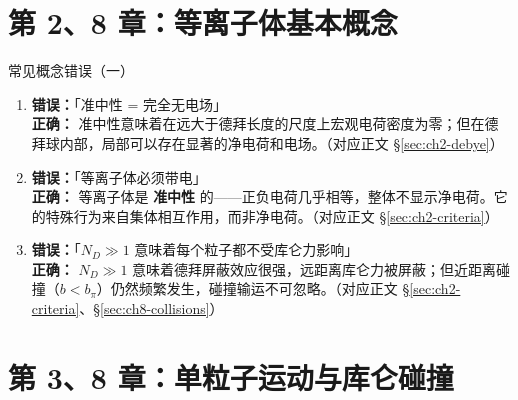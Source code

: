 \documentclass[12pt,a4paper,openany,oneside]{book}
\begin{document}
\section{第 2、8 章：等离子体基本概念}

\begin{warning}{常见概念错误（一）}{}
\begin{enumerate}
\item \textbf{错误：}「准中性 = 完全无电场」\\
\textbf{正确：} 准中性意味着在远大于德拜长度的尺度上宏观电荷密度为零；但在德拜球内部，局部可以存在显著的净电荷和电场。（对应正文 \S\ref{sec:ch2-debye}）

\item \textbf{错误：}「等离子体必须带电」\\
\textbf{正确：} 等离子体是 \textbf{准中性} 的——正负电荷几乎相等，整体不显示净电荷。它的特殊行为来自集体相互作用，而非净电荷。（对应正文 \S\ref{sec:ch2-criteria}）

\item \textbf{错误：}「$N_D\gg 1$ 意味着每个粒子都不受库仑力影响」\\
\textbf{正确：} $N_D\gg 1$ 意味着德拜屏蔽效应很强，远距离库仑力被屏蔽；但近距离碰撞（$b<b_\pi$）仍然频繁发生，碰撞输运不可忽略。（对应正文 \S\ref{sec:ch2-criteria}、\S\ref{sec:ch8-collisions}）
\end{enumerate}
\end{warning}


\section{第 3、8 章：单粒子运动与库仑碰撞}
\end{document}
